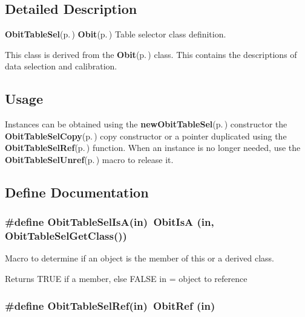 \subsection{Detailed Description}
{\bf Obit\-Table\-Sel}{\rm (p.\,\pageref{structObitTableSel})} {\bf Obit}{\rm (p.\,\pageref{structObit})} Table selector class definition. 

This class is derived from the {\bf Obit}{\rm (p.\,\pageref{structObit})} class. This contains the descriptions of data selection and calibration.\subsection{Usage}\label{ObitTableSel_8h_ObitTableSelUsage}
Instances can be obtained using the {\bf new\-Obit\-Table\-Sel}{\rm (p.\,\pageref{ObitTableSel_8c_a6})} constructor the {\bf Obit\-Table\-Sel\-Copy}{\rm (p.\,\pageref{ObitTableSel_8c_a8})} copy constructor or a pointer duplicated using the {\bf Obit\-Table\-Sel\-Ref}{\rm (p.\,\pageref{ObitTableSel_8h_a1})} function. When an instance is no longer needed, use the {\bf Obit\-Table\-Sel\-Unref}{\rm (p.\,\pageref{ObitTableSel_8h_a0})} macro to release it.

\subsection{Define Documentation}
\subsubsection{\setlength{\rightskip}{0pt plus 5cm}\#define Obit\-Table\-Sel\-Is\-A(in)\ Obit\-Is\-A (in, Obit\-Table\-Sel\-Get\-Class())}\label{ObitTableSel_8h_a2}


Macro to determine if an object is the member of this or a derived class. 

Returns TRUE if a member, else FALSE in = object to reference 
\subsubsection{\setlength{\rightskip}{0pt plus 5cm}\#define Obit\-Table\-Sel\-Ref(in)\ Obit\-Ref (in)}\label{ObitTableSel_8h_a1}


